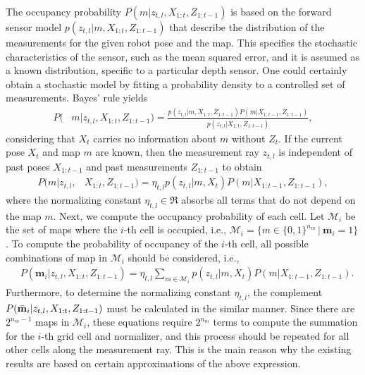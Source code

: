 The occupancy probability $P(m|z_{t,l},X_{1:t},Z_{1:t-1})$ is based on the forward sensor model $p(z_{t,l}|m,X_{1:t},Z_{1:t-1})$ that describe the distribution of the measurements for the given robot pose and the map. This specifies the stochastic characteristics of the sensor, such as the mean squared error, and it is assumed as a known distribution, specific to a particular depth sensor. One could certainly obtain a stochastic model by fitting a probability density to a controlled set of measurements. Bayes' rule yields
\begin{align}
\label{eqn:BayesRuleRayISM}
P(&m|z_{t,l},X_{1:t},Z_{1:t-1})%
=\frac{p(z_{t,l}|m,X_{1:t},Z_{1:t-1})P(m|X_{1:t-1},Z_{1:t-1})}{p(z_{t,l}|X_{1:t},Z_{1:t-1})},
\end{align}
considering that $X_t$ carries no information about $m$ without $Z_t$.
If the current pose $X_t$ and map $m$ are known, then the measurement ray $z_{t,l}$ is independent of past poses $X_{1:t-1}$ and past measurements $Z_{1:t-1}$ to obtain
\begin{align}
P(m|z_{t,l},&X_{1:t},Z_{1:t-1})%
=\eta_{t,l}p(z_{t,l}|m,X_{t})P(m|X_{1:t-1},Z_{1:t-1}),
\end{align}
where the normalizing constant $\eta_{t,l}\in\Re$ absorbs all terms that do not depend on the map $m$.
Next, we compute the occupancy probability of each cell. Let $\mathcal{M}_i$ be the set of maps where the $i$-th cell is occupied, i.e., $\mathcal{M}_i =\{m\in\{0,1\}^{{n_m}}\,|\ \mathbf{m}_i=1\}$. To compute the probability of occupancy of the $i$-th cell, all possible combinations of map in $\mathcal{M}_i$ should be considered, i.e., 
\begin{align}
\label{eqn:InvSenModWithProbDens}
&P(\mathbf{m}_i|z_{t,l},X_{1:t},Z_{1:t-1})%
=\eta_{t,l}\sum_{m\in\mathcal{M}_i}p(z_{t,l}|m,X_{t})P(m|X_{1:t-1},Z_{1:t-1}).
\end{align}
Furthermore, to determine the normalizing constant $\eta_{t,l}$, the complement $\\P(\bar{\mathbf{m}}_i|z_{t,l},X_{1:t},Z_{1:t-1})$ must be calculated in the similar manner. Since there are $2^{n_{m}-1}$ maps in $\mathcal{M}_i$, these equations require $2^{n_m}$ terms to compute the summation for the $i$-th grid cell and normalizer, and this process should be repeated for all other cells along the measurement ray. This is the main reason why the existing results are based on certain approximations of the above expression. 

